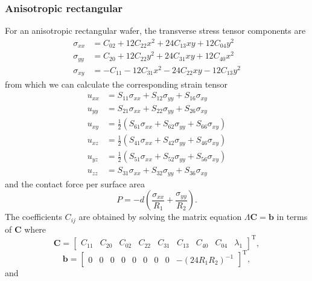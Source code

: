 \documentclass[11pt,a4paper]{article}
\begin{document}
\subsubsection{Anisotropic rectangular}
For an anisotropic rectangular wafer, the transverse stress tensor components are
\begin{align}
\sigma_{xx} &= C_{02} + 12 C_{22}x^2 + 24 C_{13} xy + 12 C_{04} y^2 \\
\sigma_{yy} &= C_{20} + 12 C_{22}y^2 + 24 C_{31} xy + 12 C_{40} x^2 \\
\sigma_{xy} &= -C_{11}  - 12 C_{31} x^2 - 24 C_{22} xy - 12 C_{13} y^2 
\end{align}
from which we can calculate the corresponding strain tensor
\begin{align}
u_{xx} &= S_{11} \sigma_{xx} + S_{12} \sigma_{yy} + S_{16} \sigma_{xy} \\
u_{yy} &= S_{21} \sigma_{xx} + S_{22} \sigma_{yy} + S_{26} \sigma_{xy} \\
u_{xy} &= \frac{1}{2}\left(S_{61}\sigma_{xx} + S_{62} \sigma_{yy} + S_{66} \sigma_{xy} \right) \\
u_{xz} &= \frac{1}{2}\left(S_{41}\sigma_{xx} + S_{42} \sigma_{yy} + S_{46} \sigma_{xy} \right) \\
u_{yz} &= \frac{1}{2}\left(S_{51}\sigma_{xx} + S_{52} \sigma_{yy} + S_{56} \sigma_{xy} \right)  \\
u_{zz} &= S_{31} \sigma_{xx} + S_{32} \sigma_{yy} + S_{36} \sigma_{xy}
\end{align}
and the contact force per surface area
\begin{equation}
P = -d \left(\frac{\sigma_{xx}}{R_1} + \frac{\sigma_{yy}}{R_2} \right).
\end{equation}
The coefficients $C_{ij}$ are obtained by solving the matrix equation $\Lambda  \mathbf{C} = \mathbf{b}$ in terms of $\mathbf{C}$ where
\begin{equation}
\mathbf{C} = \left[ \begin{matrix}
C_{11} & C_{20} & C_{02} & C_{22} & C_{31} & C_{13} & C_{40} & C_{04} & \lambda_1
\end{matrix}
\right]^{\mathrm{T}},
\end{equation}
\begin{equation}
\mathbf{b} = \left[ \begin{matrix}
0 & 0 & 0 & 0 & 0 &0 &0 & 0 & -(24 R_1 R_2)^{-1}
\end{matrix}
\right]^{\mathrm{T}},
\end{equation}
and
\end{document}
